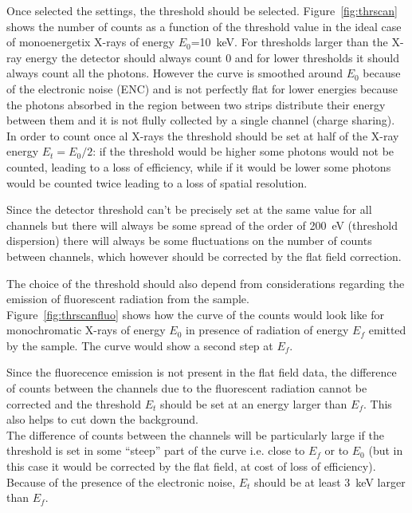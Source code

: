 Once selected the settings, the threshold should be selected.
Figure~\ref{fig:thrscan} shows the number of counts as a function of the threshold value in the ideal case of monoenergetix X-rays of energy $E_0$=10~keV.
For thresholds larger than the X-ray energy the detector should always count 0 and for lower thresholds it should always count all the photons. However the curve is smoothed around $E_0$ because of the electronic noise (ENC) and is not perfectly flat for lower energies because the photons absorbed in the region between two strips distribute their energy between them and it is not flully collected by a single channel (charge sharing).\\
In order to count once al X-rays the threshold should be set at half of the X-ray energy $E_t=E_0/2$: if the threshold would be higher some photons would not be counted, leading to a loss of efficiency, while if it would be lower some photons would be counted twice leading to a loss of spatial resolution. 

Since the detector threshold can't be precisely set at the same value for all channels but there will always be some spread of the order of 200~eV (threshold dispersion) there will always be some fluctuations on the number of counts between channels, which however should be corrected by the flat field correction.

The choice of the threshold should also depend from  considerations regarding the emission of fluorescent radiation from the sample.\\
Figure~\ref{fig:thrscanfluo} shows  how the curve of the counts would look like for monochromatic X-rays of energy $E_0$ in presence of radiation of energy $E_f$ emitted by the sample. The curve would show a second step at $E_f$. 

Since the fluorecence emission is not present in the flat field data, the difference of counts between the channels due to the fluorescent radiation cannot be corrected and the threshold $E_t$ should be set at an energy larger than $E_f$. This also helps to cut down the background.\\
The difference of counts between the channels will be particularly large if the threshold is set in some ``steep'' part of the curve i.e. close to $E_f$ or to $E_0$ (but in this case it would be corrected by the flat field, at cost of loss of efficiency).
Because of the presence of the electronic noise, $E_t$ should be at least 3~keV larger than $E_f$.

